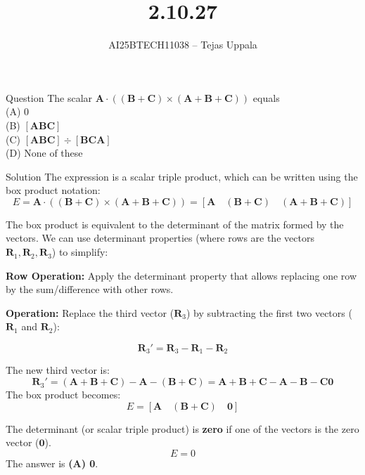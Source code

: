 \documentclass{beamer}
\title{2.10.27}
\author{AI25BTECH11038 -- Tejas Uppala}
\date{}
\theoremstyle{remark}
\numberwithin{equation}{section}
\begin{document}
\begin{frame}[fragile]
\maketitle
\end{frame}
\begin{frame}{Question}
The scalar $\mathbf{A} \cdot ((\mathbf{B} + \mathbf{C}) \times (\mathbf{A} + \mathbf{B} + \mathbf{C}))$ equals\\
    (A) 0\\
    (B) $[\mathbf{A} \mathbf{B} \mathbf{C}]$\\
    (C) $[\mathbf{A} \mathbf{B} \mathbf{C}] \div [\mathbf{B} \mathbf{C} \mathbf{A}]$\\
    (D) None of these
\end{frame}


\begin{frame}{Solution}
The expression is a scalar triple product, which can be written using the box product notation:
\begin{equation}
E = \mathbf{A} \cdot ((\mathbf{B} + \mathbf{C}) \times (\mathbf{A} + \mathbf{B} + \mathbf{C})) = [\mathbf{A} \quad (\mathbf{B} + \mathbf{C}) \quad (\mathbf{A} + \mathbf{B} + \mathbf{C})]    
\end{equation}

The box product is equivalent to the determinant of the matrix formed by the vectors. We can use determinant properties (where rows are the vectors $\mathbf{R}_1, \mathbf{R}_2, \mathbf{R}_3$) to simplify:

\textbf{Row Operation:} Apply the determinant property that allows replacing one row by the sum/difference with other rows.

\textbf{Operation:} Replace the third vector ($\mathbf{R}_3$) by subtracting the first two vectors ($\mathbf{R}_1$ and $\mathbf{R}_2$):

\begin{equation}
    \mathbf{R}_3' = \mathbf{R}_3 - \mathbf{R}_1 - \mathbf{R}_2
\end{equation}
\end{frame}

\begin{frame}
The new third vector is:
\begin{equation}
 \mathbf{R}_3' = (\mathbf{A} + \mathbf{B} + \mathbf{C}) - \mathbf{A} - (\mathbf{B} + \mathbf{C}) = \mathbf{A} + \mathbf{B} + \mathbf{C} - \mathbf{A} - \mathbf{B} - \mathbf{C}  \mathbf{0}   
\end{equation}
The box product becomes:
\begin{equation}
    E = [\mathbf{A} \quad (\mathbf{B} + \mathbf{C}) \quad \mathbf{0}]
\end{equation}

The determinant (or scalar triple product) is \textbf{zero} if one of the vectors is the zero vector ($\mathbf{0}$).
$$E = 0$$
The answer is \textbf{(A) 0}.

\end{frame}
\end{document}
